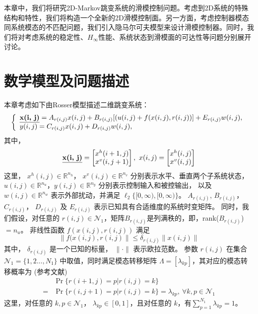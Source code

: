 	本章中，我们将研究2D-Markov跳变系统的滑模控制问题。考虑到2D系统的特殊结构和特性，我们将构造一个全新的2D滑模控制面。另一方面，考虑控制器模态同系统模态的不匹配问题，我们引入隐马尔可夫模型来设计滑模控制器。同时，我们将对考虑系统的稳定性、$H_\infty$性能、系统状态到滑模面的可达性等问题分别展开讨论。

\section{数学模型及问题描述}
	本章考虑如下由Rosser模型描述二维跳变系统：
	\begin{equation} \label{system-equation}
	\left\{
	\begin{array}{lr}
	\begin{split}
	\emph{\textbf{x(i, j)}} = A_{r(i,j)}x(i,j)+B_{r(i,j)}[(u(i,j)+f(x(i,j),r(i,j))]+E_{r(i,j)}w(i,j),
	\end{split}\\
	\begin{split}
	y(i,j) = C_{r(i,j)}x(i,j)+D_{r(i,j)}w(i,j),
	\end{split}
	\end{array}
	\right.
	\end{equation}
	其中，
	\begin{equation*}
	\emph{\textbf{x(i, j)}} = \begin{bmatrix}
	x^{h}(i+1,j)\\
	x^{v}(i,j+1)
	\end{bmatrix}, \ 
	x(i, j) = \begin{bmatrix}
	x^{h}(i,j)\\
	x^{v}(i,j)
	\end{bmatrix}          
	\end{equation*}
	这里，	$x^{h}(i,j)\in \mathbb{R}^{n_h}$， $x^{v}(i,j)\in \mathbb{R}^{n_v}$ 分别表示水平、垂直两个子系统状态， $u(i,j) \in \mathbb{R}^{n_u}$，$y(i,j) \in \mathbb{R}^{n_y}$ 分别表示控制输入和被控输出， 以及 $w(i,j) \in \mathbb{R}^{n_w}$ 表示外部扰动，并满足 $\ell_{2}\{[0,\infty),[0,\infty)\}$。 $A_{r(i,j)}$, $B_{r(i,j)}$， $C_{r(i,j)}$， $D_{r(i,j)}$ 及 $E_{r(i,j)}$ 表示已知具有合适维度的系统时变矩阵。 同时，我们假设，对任意的 $r(i,j)\in\mathcal{N}_{1}$，矩阵$B_{r(i,j)}$是列满秩的，即，rank($B_{r(i,j)}$)$=n_u$。 非线性函数 $f(x(i,j),r(i,j))$ 满足
	\begin{equation}\label{nonlinear-func}
	\|f(x(i,j),r(i,j)\| \leq \delta_{r(i,j)}\|x(i,j)\|
	\end{equation}
	其中， $\delta_{r(i,j)}$ 是一个已知的标量， $\|\cdot\|$ 表示欧拉范数。 参数 $r(i,j)$ 在集合 $\mathcal{N}_{1}=\{1,2...,N_{1} \}$ 中取值，同时满足模态转移矩阵 $\varLambda = [\lambda_{kp}]$，其对应的模态转移概率为  (参考文献\cite{wu2018hcontrol2d,wu2008hfiltering2d})
	\begin{equation}\label{tps_system}
	\begin{split}
	&\Pr\{r(i+1,j)=p|r(i,j)=k\}\\
	=&\Pr\{r(i,j+1)=p|r(i,j)=k\}=\lambda_{kp},\  \forall k,p \in \mathcal{N}_{1}
	\end{split}
	\end{equation}	
	这里，对任意的  $k, p\in\mathcal{N}_{1}$， $\lambda_{kp}\in[0,1]$，且对任意的 $k$，有$\sum_{p=1}^{N_1}\lambda_{kp}=1$。
	
